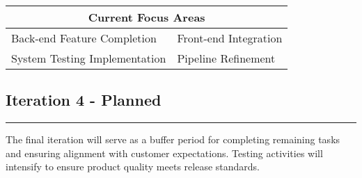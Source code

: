 \vspace{0.5cm}
\begin{center}
\begin{tabular}{|p{}|p{}|}
\hline
\multicolumn{2}{|c|}{\textbf{Current Focus Areas}} \\
\hline
Back-end Feature Completion & Front-end Integration \\
System Testing Implementation & Pipeline Refinement \\
\hline
\end{tabular}
\end{center}
\vspace{0.5cm}

\subsection{Iteration 4 - Planned}
\noindent\rule{\textwidth}{0.4pt}

The final iteration will serve as a buffer period for completing remaining tasks and ensuring alignment with customer expectations. Testing activities will intensify to ensure product quality meets release standards.

\begin{center}
\noindent{}
\end{center}

